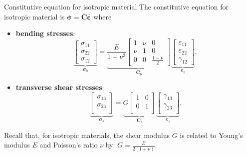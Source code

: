 \documentclass[aspectratio=169]{beamer}
\begin{document}
\begin{frame}{Constitutive equation for isotropic material}
  The constitutive equation for isotropic material is $\overline{\boldsymbol{\sigma}}=\overline{\mathbf C}\overline{\boldsymbol{\varepsilon}}$ where
  \begin{itemize}
    \item \textbf{bending stresses}:
          \[
            \underbrace{\begin{bmatrix}
                \sigma_{11} \\
                \sigma_{22} \\
                \sigma_{12}
              \end{bmatrix}}_\text{$\boldsymbol{\sigma}_b$}
            = \underbrace{
              \frac{E}{1 - \nu^2}
              \begin{bmatrix}
                1   & \nu & 0                 \\
                \nu & 1   & 0                 \\
                0   & 0   & \frac{1 - \nu}{2}
              \end{bmatrix}}_\text{$\mathbf{C}_b$}
            \underbrace{\begin{bmatrix}
                \varepsilon_{11} \\
                \varepsilon_{22} \\
                \gamma_{12}
              \end{bmatrix}}_\text{$\boldsymbol{\varepsilon}_b$},
          \]
    \item \textbf{transverse shear stresses}:
          \[
            \underbrace{\begin{bmatrix}
                \sigma_{13} \\
                \sigma_{23} \\
              \end{bmatrix}}_\text{$\boldsymbol{\sigma}_s$}
            = \underbrace{
              G
              \begin{bmatrix}
                1 & 0 \\
                0 & 1 \\
              \end{bmatrix}}_\text{$\mathbf{C}_s$}
            \underbrace{\begin{bmatrix}
                \gamma_{13} \\
                \gamma_{23} \\
              \end{bmatrix}}_\text{$\boldsymbol{\varepsilon}_s$}.
          \]
  \end{itemize}
  Recall that, for isotropic materials, the shear modulus $G$ is related to Young’s modulus $E$ and Poisson’s ratio $\nu$ by: $G = \frac{E}{2(1 + \nu)}$.
\end{frame}
\end{document}
